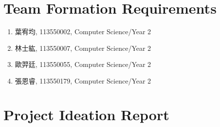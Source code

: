 \section{Team Formation Requirements}
\begin{enumerate}
    \item 葉宥均, 113550002, Computer Science/Year 2
    \item 林士紘, 113550007, Computer Science/Year 2
    \item 歐羿廷, 113550055, Computer Science/Year 2
    \item 張恩睿, 113550179, Computer Science/Year 2
\end{enumerate}

\section{Project Ideation Report}
